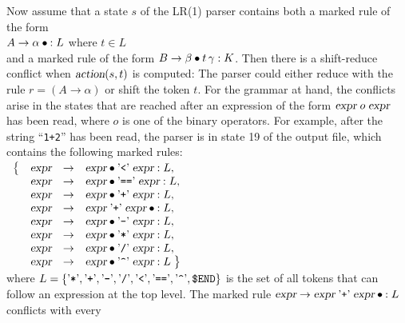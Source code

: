 Now assume that a state $s$ of the LR(1) parser contains both a marked rule of the form
\\[0.2cm]
\hspace*{1.3cm}
$A \rightarrow \alpha \mdot: L$ \quad where $t \in L$
\\[0.2cm]
and a marked rule of the form $B \rightarrow \beta \mdot t\, \gamma: K$.  Then there is a shift-reduce conflict
when $\textsl{action}(s,t)$ is computed:  The parser could either reduce with the rule $r = (A \rightarrow \alpha)$
or shift the token $t$.  For the grammar at hand, the conflicts arise in the states that are reached after an
expression of the form $\textsl{expr}\; o\; \textsl{expr}$ has been read, where $o$ is one of the binary
operators.  For example, after the string ``\texttt{1+2}'' has been read, the parser is in state 19 of the
output file, which contains the following marked rules:
\\[0.2cm]
\hspace*{1.3cm}
$\begin{array}[t]{llcl}
   \bigl\{ & \textsl{expr} & \rightarrow & \textsl{expr} \mdot \saquoted{<}\; \textsl{expr}: L,  \\
           & \textsl{expr} & \rightarrow & \textsl{expr} \mdot \saquoted{==}\; \textsl{expr}: L, \\
           & \textsl{expr} & \rightarrow & \textsl{expr} \mdot \saquoted{+}\; \textsl{expr}: L,  \\
           & \textsl{expr} & \rightarrow & \textsl{expr} \aquoted{+} \textsl{expr} \mdot: L,       \\
           & \textsl{expr} & \rightarrow & \textsl{expr} \mdot \saquoted{-}\; \textsl{expr}: L,  \\
           & \textsl{expr} & \rightarrow & \textsl{expr} \mdot \saquoted{*}\; \textsl{expr}: L,  \\
           & \textsl{expr} & \rightarrow & \textsl{expr} \mdot \saquoted{/}\; \textsl{expr}: L,  \\
           & \textsl{expr} & \rightarrow & \textsl{expr} \mdot \saquoted{\symbol{94}}\; \textsl{expr}: L
             \;\bigr\}
 \end{array}$
\\[0.2cm]
where $L = \{ \saquoted{*}, \saquoted{+}, \saquoted{-}, \saquoted{/}, \saquoted{<}, \saquoted{==},
\saquoted{\symbol{94}}, \texttt{\$END} \}$ is the set of all tokens that can follow an expression at the top level.
The marked rule $\textsl{expr} \rightarrow \textsl{expr} \aquoted{+} \textsl{expr} \mdot: L$ conflicts with every

